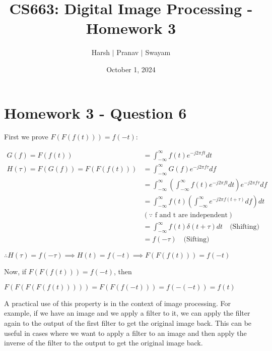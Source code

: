 \documentclass{article}
\title{CS663: Digital Image Processing - Homework 3}
\author{Harsh $\vert$ Pranav $\vert$ Swayam}
\date{October 1, 2024}
\begin{document}
\maketitle
\section{Homework 3 - Question 6}

First we prove \( F(F(f(t))) = f(-t) \):

\begin{align*}
    G(f) = F(f(t)) &= \int_{-\infty}^{\infty} f(t) e^{-j 2 \pi f t} dt \\
    H(\tau) = F(G(f)) = F(F(f(t))) &= \int_{-\infty}^{\infty} G(f) e^{-j 2 \pi f \tau} df \\
    &= \int_{-\infty}^{\infty} \left( \int_{-\infty}^{\infty} f(t) e^{-j 2 \pi f t} dt \right) e^{-j 2 \pi f \tau} df \\
    &= \int_{-\infty}^{\infty} f(t) \left( \int_{-\infty}^{\infty} e^{-j 2 \pi f (t + \tau)} df \right) dt \\ &(\because\text{ f and t are independent}) \\
    &= \int_{-\infty}^{\infty} f(t) \delta(t + \tau) dt \quad \text{(Shifting)} \\
    &= f(-\tau) \quad \text{(Sifting)}
\end{align*}

$\therefore H(\tau) = f(-\tau) \implies H(t) = f(-t) \implies F(F(f(t))) = f(-t)$

Now, if \( F(F(f(t))) = f(-t) \), then 

$F(F(F(F(f(t))))) = F(F(f(-t))) = f(-(-t)) = f(t)$

A practical use of this property is in the context of image processing. For example, if we have an image and we apply a filter to it, we can apply the filter again to the output of the first filter to get the original image back. This can be useful in cases where we want to apply a filter to an image and then apply the inverse of the filter to the output to get the original image back.
\end{document}
